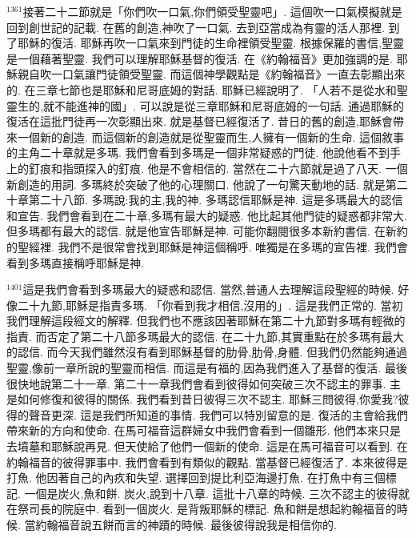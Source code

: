 \documentclass{book}
\begin{document}
$^{1361}$接著二十二節就是「你們吹一口氣,你們領受聖靈吧」.
這個吹一口氣模擬就是回到創世記的記載.
在舊的創造,神吹了一口氣.
去到亞當成為有靈的活人那裡.
到了耶穌的復活.
耶穌再吹一口氣來到門徒的生命裡領受聖靈.
根據保羅的書信,聖靈是一個藉著聖靈.
我們可以理解耶穌基督的復活.
在《約翰福音》更加強調的是.
耶穌親自吹一口氣讓門徒領受聖靈.
而這個神學觀點是《約翰福音》一直去彰顯出來的.
在三章七節也是耶穌和尼哥底姆的對話.
耶穌已經說明了.
「人若不是從水和聖靈生的,就不能進神的國」.
可以說是從三章耶穌和尼哥底姆的一句話.
通過耶穌的復活在這批門徒再一次彰顯出來.
就是基督已經復活了.
昔日的舊的創造,耶穌會帶來一個新的創造.
而這個新的創造就是從聖靈而生,人擁有一個新的生命.
這個敘事的主角二十章就是多瑪.
我們會看到多瑪是一個非常疑惑的門徒.
他說他看不到手上的釘痕和指頭探入的釘痕.
他是不會相信的.
當然在二十六節就是過了八天.
一個新創造的用詞.
多瑪終於突破了他的心理關口.
他說了一句驚天動地的話.
就是第二十章第二十八節.
多瑪說:我的主,我的神.
多瑪認信耶穌是神.
這是多瑪最大的認信和宣告.
我們會看到在二十章,多瑪有最大的疑惑.
他比起其他門徒的疑惑都非常大.
但多瑪都有最大的認信.
就是他宣告耶穌是神.
可能你翻閱很多本新約書信.
在新約的聖經裡.
我們不是很常會找到耶穌是神這個稱呼.
唯獨是在多瑪的宣告裡.
我們會看到多瑪直接稱呼耶穌是神.

$^{1401}$這是我們會看到多瑪最大的疑惑和認信.
當然,普通人去理解這段聖經的時候.
好像二十九節,耶穌是指責多瑪.
「你看到我才相信,沒用的」.
這是我們正常的.
當初我們理解這段經文的解釋.
但我們也不應該因著耶穌在第二十九節對多瑪有輕微的指責.
而否定了第二十八節多瑪最大的認信.
在二十九節,其實重點在於多瑪有最大的認信.
而今天我們雖然沒有看到耶穌基督的肋骨,肋骨,身體.
但我們仍然能夠通過聖靈,像前一章所說的聖靈而相信.
而這是有福的,因為我們進入了基督的復活.
最後很快地說第二十一章.
第二十一章我們會看到彼得如何突破三次不認主的罪事.
主是如何修復和彼得的關係.
我們看到昔日彼得三次不認主.
耶穌三問彼得,你愛我?彼得的聲音更深.
這是我們所知道的事情.
我們可以特別留意的是.
復活的主會給我們帶來新的方向和使命.
在馬可福音這群婦女中我們會看到一個雛形.
他們本來只是去墳墓和耶穌說再見.
但天使給了他們一個新的使命.
這是在馬可福音可以看到.
在約翰福音的彼得罪事中.
我們會看到有類似的觀點.
當基督已經復活了.
本來彼得是打魚.
他因著自己的內疚和失望.
選擇回到提比利亞海邊打魚.
在打魚中有三個標記.
一個是炭火,魚和餅.
炭火,說到十八章.
這批十八章的時候.
三次不認主的彼得就在祭司長的院庭中.
看到一個炭火.
是背叛耶穌的標記.
魚和餅是想起約翰福音的時候.
當約翰福音說五餅而言的神蹟的時候.
最後彼得說我是相信你的.
\end{document}
